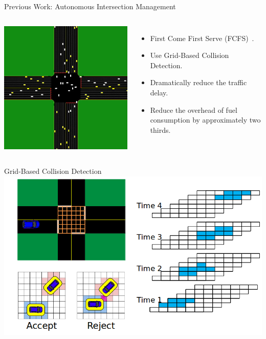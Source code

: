 \documentclass{beamer}
\begin{document}
\begin{frame}{Previous Work: Autonomous Intersection Management}
\begin{columns}[c]
		\includegraphics[width=\textwidth]{aim.png}
				
		\begin{itemize}
		\item First Come First Serve (FCFS)~\cite{bib:Dresner08Multiagent}.
		\item Use Grid-Based Collision Detection.\pause
		\item Dramatically reduce the traffic delay.
		\item Reduce the overhead of fuel consumption by approximately
		two thirds.
		\end{itemize}
\end{columns}
\end{frame}

\begin{frame}{Grid-Based Collision Detection}
	\includegraphics[width=\textwidth]{grids.png}
\end{frame}
\end{document}
